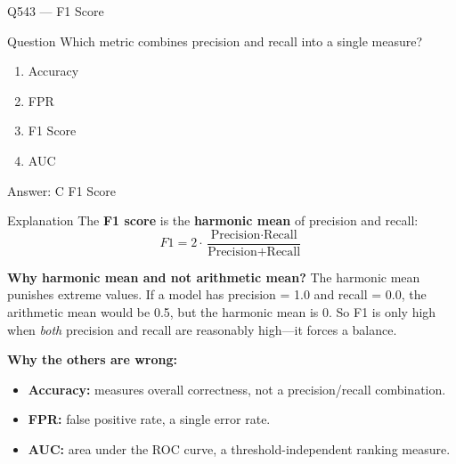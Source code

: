 \documentclass[aspectratio=169,8pt]{beamer}
\begin{document}
	\begin{frame}{Q543 --- F1 Score}
		\begin{block}{Question}
			Which metric combines precision and recall into a single measure?
			
			\begin{enumerate}
				\item Accuracy
				\item FPR
				\item F1 Score
				\item AUC
			\end{enumerate}
		\end{block}
		
		\begin{exampleblock}{Answer: C}
			F1 Score
		\end{exampleblock}
		
		\begin{block}{Explanation}
			The \textbf{F1 score} is the \textbf{harmonic mean} of precision and recall:
			\[
			F1 = 2 \cdot \frac{\text{Precision} \cdot \text{Recall}}{\text{Precision} + \text{Recall}}
			\]
			
			\textbf{Why harmonic mean and not arithmetic mean?}
			The harmonic mean punishes extreme values. If a model has precision = 1.0
			and recall = 0.0, the arithmetic mean would be 0.5, but the harmonic mean
			is 0. So F1 is only high when \emph{both} precision and recall are
			reasonably high---it forces a balance.
			
			\textbf{Why the others are wrong:}
			\begin{itemize}
				\item \textbf{Accuracy:} measures overall correctness, not a
				precision/recall combination.
				\item \textbf{FPR:} false positive rate, a single error rate.
				\item \textbf{AUC:} area under the ROC curve, a threshold-independent
				ranking measure.
			\end{itemize}
		\end{block}
	\end{frame}
	
\end{document}
